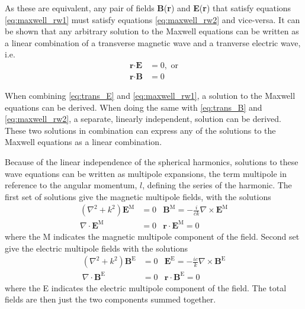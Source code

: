 As these are equivalent, any pair of fields \textbf{B}(\textbf{r}) and \textbf{E}(\textbf{r}) that satisfy equations \ref{eq:maxwell_rw1} must satisfy equations \ref{eq:maxwell_rw2} and vice-versa. It can be shown that any arbitrary solution to the Maxwell equations can be written as a linear combination of a transverse magnetic wave and a tranverse electric wave, i.e. 
\begin{align}
    \label{eq:trans_E}
    \textbf{r} \cdot \textbf{E} & = 0, \text{ or} \\
    \label{eq:trans_B}
    \textbf{r} \cdot \textbf{B} & = 0
\end{align}

When combining \ref{eq:trans_E} and \ref{eq:maxwell_rw1}, a solution to the Maxwell equations can be derived. When doing the same with \ref{eq:trans_B} and \ref{eq:maxwell_rw2}, a separate, linearly independent, solution can be derived. These two solutions in combination can express any of the solutions to the Maxwell equations as a linear combination.

Because of the linear independence of the spherical harmonics, solutions to these wave equations can be written as multipole expansions, the term multipole in reference to the angular momentum, $l$, defining the series of the harmonic. The first set of solutions give the magnetic multipole fields, with the solutions
\begin{subequations}
\label{eq:magnetic_sol}
\begin{align}
    \left(\nabla^2+k^2\right)\textbf{E}^\text{M} & = 0 & \textbf{B}^\text{M}=-\frac{i}{ck} \nabla \times \textbf{E}^\text{M} \\
    \nabla \cdot \textbf{E}^\text{M} & = 0 & \textbf{r}\cdot\textbf{E}^\text{M}=0
\end{align}
\end{subequations}
where the M indicates the magnetic multipole component of the field. Second set give the electric multipole fields with the solutions
\begin{subequations}
\label{eq:electric_sol}
\begin{align}
    \left(\nabla^2+k^2\right)\textbf{B}^\text{E} & = 0 & \textbf{E}^\text{E}=-\frac{ic}{k} \nabla \times \textbf{B}^\text{E} \\
    \nabla \cdot \textbf{B}^\text{E} & = 0 & \textbf{r}\cdot\textbf{B}^\text{E}=0
\end{align}
\end{subequations}
where the E indicates the electric multipole component of the field. The total fields are then just the two components summed together.

